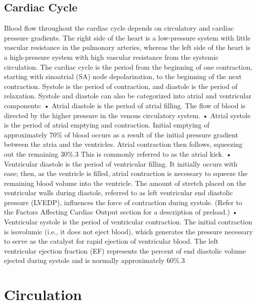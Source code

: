\subsection{Cardiac Cycle}
Blood flow throughout the cardiac cycle depends on circulatory and cardiac pressure gradients. The right side of the heart is a low-pressure system with little vascular resistance in the pulmonary arteries, whereas the left side of the heart is a high-pressure system with high vascular resistance from the systemic circulation. The cardiac cycle is the period from the beginning of one contraction, starting with sinoatrial (SA) node depolarization, to the beginning of the next contraction. Systole is the period of contraction, and diastole is the period of relaxation. Systole and diastole can also be categorized into atrial and ventricular components:
•	Atrial diastole is the period of atrial filling. The flow of blood is directed by the higher pressure in the venous circulatory system.
•	Atrial systole is the period of atrial emptying and contraction. Initial emptying of approximately 70\% of blood occurs as a result of the initial pressure gradient between the atria and the ventricles. Atrial contraction then follows, squeezing out the remaining 30\%.3 This is commonly referred to as the atrial kick.
•	Ventricular diastole is the period of ventricular filling. It initially occurs with ease; then, as the ventricle is filled, atrial contraction is necessary to squeeze the remaining blood volume into the ventricle. The amount of stretch placed on the ventricular walls during diastole, referred to as left ventricular end diastolic pressure (LVEDP), influences the force of contraction during systole. (Refer to the Factors Affecting Cardiac Output section for a description of preload.)
•	Ventricular systole is the period of ventricular contraction. The initial contraction is isovolumic (i.e., it does not eject blood), which generates the pressure necessary to serve as the catalyst for rapid ejection of ventricular blood. The left ventricular ejection fraction (EF) represents the percent of end diastolic volume ejected during systole and is normally approximately 60\%.3


\section{Circulation}

